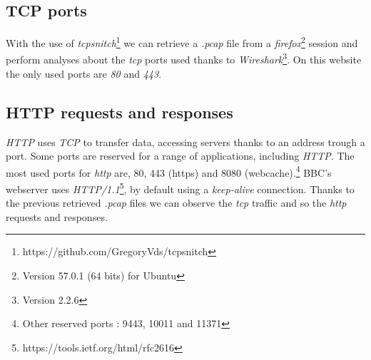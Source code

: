 \documentclass[conference]{IEEEtran}
\begin{document}
\subsection{TCP ports}
With the use of \textit{tcpsnitch}\footnote{https://github.com/GregoryVds/tcpsnitch} we can retrieve a \textit{.pcap} file from a \textit{firefox}\footnote{Version 57.0.1 (64 bits) for Ubuntu} session and perform analyses about the \textit{tcp} ports used thanks to \textit{Wireshark}\footnote{Version 2.2.6}. On this website the only used ports are \textit{80} and \textit{443}. 

\subsection{HTTP requests and responses}

\textit{HTTP} uses \textit{TCP} to transfer data, accessing servers thanks to an address trough a port. Some ports are reserved for a range of applications, including \textit{HTTP}. The most used ports for \textit{http} are, 80, 443 (https) and 8080 (webcache).\footnote{Other reserved ports : 9443, 10011 and 11371} BBC's webserver uses \textit{HTTP/1.1}\footnote{https://tools.ietf.org/html/rfc2616}, by default using a \textit{keep-alive} connection. Thanks to the previous retrieved \textit{.pcap} files we can observe the \textit{tcp} traffic and so the \textit{http} requests and responses. 
\end{document}
